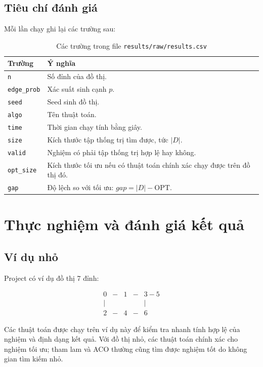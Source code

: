 \documentclass[12pt, a4paper]{report}
\newcommand{\OPT}{\mathrm{OPT}}
\begin{document}
\section{Tiêu chí đánh giá}

Mỗi lần chạy ghi lại các trường sau:

\begin{table}[H]
  \centering
  \caption{Các trường trong file \texttt{results/raw/results.csv}}
  \begin{tabular}{p{3cm} p{9cm}}
    \toprule
    \textbf{Trường} & \textbf{Ý nghĩa} \\
    \midrule
    \texttt{n} & Số đỉnh của đồ thị. \\
    \texttt{edge\_prob} & Xác suất sinh cạnh $p$. \\
    \texttt{seed} & Seed sinh đồ thị. \\
    \texttt{algo} & Tên thuật toán. \\
    \texttt{time} & Thời gian chạy tính bằng giây. \\
    \texttt{size} & Kích thước tập thống trị tìm được, tức $|D|$. \\
    \texttt{valid} & Nghiệm có phải tập thống trị hợp lệ hay không. \\
    \texttt{opt\_size} & Kích thước tối ưu nếu có thuật toán chính xác chạy được trên đồ thị đó. \\
    \texttt{gap} & Độ lệch so với tối ưu: $gap=|D|-\OPT$. \\
    \bottomrule
  \end{tabular}
\end{table}

\chapter{Thực nghiệm và đánh giá kết quả}

\section{Ví dụ nhỏ}

Project có ví dụ đồ thị 7 đỉnh:

\[
\begin{array}{ccccc}
0 & - & 1 & - & 3 - 5\\
| &   &   &   &     |\\
2 & - & 4 & - & 6
\end{array}
\]

Các thuật toán được chạy trên ví dụ này để kiểm tra nhanh tính hợp lệ của nghiệm và định dạng kết quả.
Với đồ thị nhỏ, các thuật toán chính xác cho nghiệm tối ưu; tham lam và ACO thường cũng tìm được nghiệm
tốt do không gian tìm kiếm nhỏ.
\end{document}

